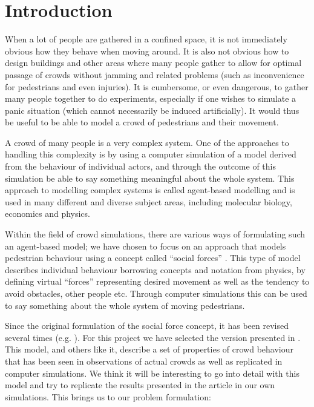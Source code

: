 \section{Introduction}
When a lot of people are gathered in a confined space, it is not immediately 
obvious how they behave when moving around. It is also not obvious how to 
design buildings and other areas where many people gather to allow for optimal 
passage of crowds without jamming and related problems (such as inconvenience 
for pedestrians and even injuries). It is cumbersome, or even dangerous, to 
gather many people together to do experiments, especially if one wishes to 
simulate a panic situation (which cannot necessarily be induced artificially).  
It would thus be useful to be able to model a crowd of pedestrians and their 
movement.

A crowd of many people is a very complex system. One of the approaches to 
handling this complexity is by using a computer simulation of a model derived 
from the behaviour of individual actors, and through the outcome of this 
simulation be able to say something meaningful about the whole system. This 
approach to modelling complex systems is called agent-based modelling and is 
used in many different and diverse subject areas, including molecular biology, 
economics and physics.

Within the field of crowd simulations, there  are various ways of formulating 
such an agent-based model; we have chosen to focus on an approach that models 
pedestrian behaviour using a concept called ``social forces'' 
\cite{social-force}. This type of model describes individual behaviour 
borrowing concepts and notation from physics, by defining  virtual ``forces'' 
representing desired movement as well as the tendency to avoid obstacles, 
other people etc. Through computer simulations this can be used to say 
something about the whole system of moving pedestrians.

Since the original formulation of the social force concept, it has been 
revised several times (e.g.  \cite{helbing00}). For this project we have 
selected the version presented in \cite{self-org}.  This model, and others 
like it, describe a set of properties of crowd behaviour that has been seen in 
observations of actual crowds as well as replicated in computer simulations. 
We think it will be interesting to go into detail with this model and try to 
replicate the results presented in the article in our own simulations. This 
brings us to our problem formulation:

